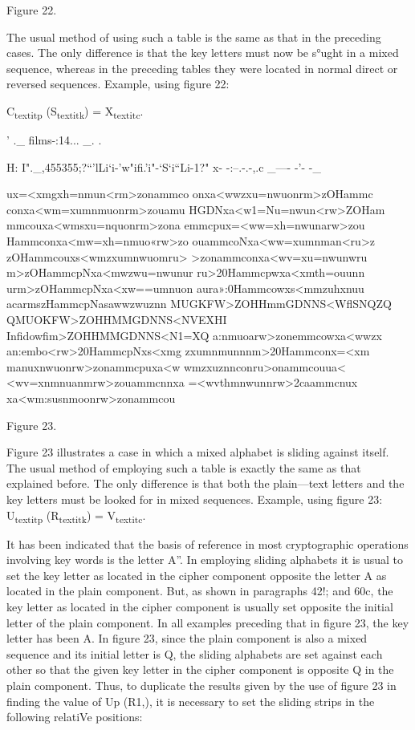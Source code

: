Figure 22.

The usual method of using such a table is the same as that in the preceding cases. The only difference is that the key letters must now be
s°ught in a mixed sequence, whereas in the preceding tables they were
located in normal direct or reversed sequences. Example, using ﬁgure 22:

C\textsubscript{textit{p}} (S\textsubscript{textit{k}}) = X\textsubscript{textit{c}}.


 

' ._ ﬁlms-:14... _. .

H: I"._,455355;?“'lLi‘i-'w"ifi.'i"-‘S‘i“Li-1?" x- -:--.-.-,.c _---- -'- -_

ux=<xmgxh=nmun<rm>zonammco
onxa<wwzxu=nwuonrm>zOHammc
conxa<wm=xumnmuonrm>zouamu
HGDNxa<w1=Nu=nwun<rw>ZOHam
mmcouxa<wmsxu=nquonrm>zona
emmcpux=<ww=xh=nwunarw>zou
Hammconxa<mw=xh=nmuo«rw>zo
ouammcoNxa<ww=xumnman<ru>z
zOHammcouxs<wmzxumnwuomru>
>zonammconxa<wv=xu=nwunwru
m>zOHammcpNxa<mwzwu=nwunur
ru>20Hammcpwxa<xmth=ouunn
urm>zOHammcpNxa<xw==umnuon
aura»:0Hammcowxs<mmzuhxnuu
acarmszHammcpNasawwzwuznn
MUGKFW>ZOHHmmGDNNS<WﬂSNQZQ
QMUOKFW>ZOHHMMGDNNS<NVEXHI
Inﬁdowﬁm>ZOHHMMGDNNS<N1=XQ
a:nmuoarw>zonemmcowxa<wwzx
an:embo<rw>20HammcpNxs<xmg
zxumnmunnnm>20Hammconx=<xm
manuxnwuonrw>zonammcpuxa<w
wmzxuznnconru>onammcouua<
<wv=xnmnuanmrw>zouammcnnxa
=<wvthmnwunnrw>2caammcnux
xa<wm:susnmoonrw>zonammcou

Figure 23.

\mypara Figure 23 illustrates a case in which a mixed alphabet is sliding
against itself. The usual method of employing such a table is exactly
the same as that explained before. The only difference is that both the
plain—text letters and the key letters must be looked for in mixed
sequences. Example, using ﬁgure 23: U\textsubscript{textit{p}} (R\textsubscript{textit{k}}) = V\textsubscript{textit{c}}.

\mypara It has been indicated that the basis of reference in most cryptographic operations involving key words is the letter A”. In employing
sliding alphabets it is usual to set the key letter as located in the cipher
component opposite the letter A as located in the plain component. But,
as shown in paragraphs 42!; and 60c, the key letter as located in the
cipher component is usually set opposite the initial letter of the plain
component. In all examples preceding that in ﬁgure 23, the key letter has
been A. In ﬁgure 23, since the plain component is also a mixed sequence
and its initial letter is Q, the sliding alphabets are set against each other
so that the given key letter in the cipher component is opposite Q in the
plain component. Thus, to duplicate the results given by the use of ﬁgure
23 in ﬁnding the value of Up (R1,), it is necessary to set the sliding strips
in the following relatiVe positions:

